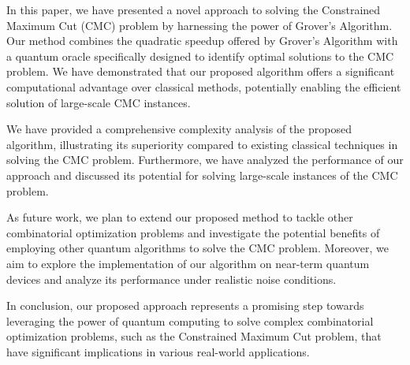 In this paper, we have presented a novel approach to solving the Constrained Maximum Cut (CMC) problem by harnessing the power of Grover's Algorithm. Our method combines the quadratic speedup offered by Grover's Algorithm with a quantum oracle specifically designed to identify optimal solutions to the CMC problem. We have demonstrated that our proposed algorithm offers a significant computational advantage over classical methods, potentially enabling the efficient solution of large-scale CMC instances.

We have provided a comprehensive complexity analysis of the proposed algorithm, illustrating its superiority compared to existing classical techniques in solving the CMC problem. Furthermore, we have analyzed the performance of our approach and discussed its potential for solving large-scale instances of the CMC problem.

As future work, we plan to extend our proposed method to tackle other combinatorial optimization problems and investigate the potential benefits of employing other quantum algorithms to solve the CMC problem. Moreover, we aim to explore the implementation of our algorithm on near-term quantum devices and analyze its performance under realistic noise conditions.

In conclusion, our proposed approach represents a promising step towards leveraging the power of quantum computing to solve complex combinatorial optimization problems, such as the Constrained Maximum Cut problem, that have significant implications in various real-world applications.

